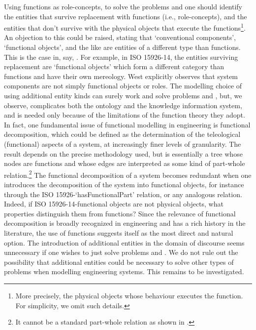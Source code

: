 \documentclass[
]{ceurart}
\begin{document}
Using functions as role-concepts, to solve the problems  and  one should identify the entities that survive replacement with functions (i.e., role-concepts), and the entities that don't survive with the physical objects that execute the functions\footnote{More precisely, the physical objects whose behaviour executes the function. For simplicity, we omit such details.}. 
An objection to this could be raised, stating that `conventional components', `functional objects', and the like are entities of a different type than functions. This is the case in, say, \cite{westDevelopingHighQuality2011,guarinoArtefactualSystemsMissing2014,kluwerISO159261420202020}. For example, in ISO 15926-14, the entities surviving replacement are `functional objects' which form a different category than functions and have their own mereology. West \cite{westDevelopingHighQuality2011} explicitly observes that system components are not simply functional objects or roles. 
The modelling choice of using additional entity kinds can surely work and solve problems  and , but, we observe, complicates both the ontology and the knowledge information system, and is needed only because of the limitations of the function theory they adopt. 
In fact, one fundamental issue of functional modelling in engineering is functional decomposition, which could be defined as the determination of the teleological (functional) aspects of a system, at increasingly finer levels of granularity. The result depends on the precise methodology used, but is essentially a tree whose nodes are functions and whose edges are interpreted as some kind of part-whole relation.\footnote{It cannot be a standard part-whole relation as shown in \cite{vermaasFormalImpossibilityAnalysing2013}.}
The functional decomposition of a system becomes redundant when one introduces the decomposition of the system into functional objects, for instance through the ISO 15926-`hasFunctionalPart' relation, or any analogous relation. Indeed, if ISO 15926-14-functional objects are not physical objects, what properties distinguish them from functions?
Since the relevance of functional decomposition is broadly recognized in engineering and has a rich history in the literature, the use of functions suggests itself as the most direct and natural option.
The introduction of additional entities in the domain of discourse
seems unnecessary if one wishes to just solve problems  and . We do not rule out the possibility that additional entities could be necessary to solve other types of problems when modelling engineering systems. This remains to be investigated.
\end{document}
